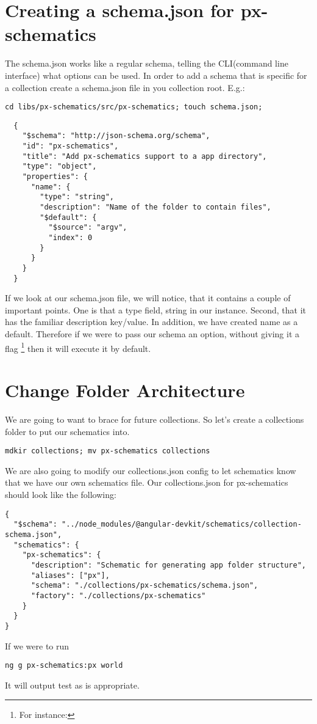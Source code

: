 \section{ Creating a schema.json for px-schematics }
The schema.json works like a regular schema, telling the CLI(command line
interface) what options can be used. In order to add a schema that is specific
for a collection create a schema.json file in you collection root. E.g.:
\begin{verbatim}
cd libs/px-schematics/src/px-schematics; touch schema.json;
\end{verbatim}

\begin{lstlisting}
  {
    "$schema": "http://json-schema.org/schema",
    "id": "px-schematics",
    "title": "Add px-schematics support to a app directory",
    "type": "object",
    "properties": {
      "name": {
        "type": "string",
        "description": "Name of the folder to contain files",
        "$default": {
          "$source": "argv",
          "index": 0
        }
      }
    }
  }
\end{lstlisting}
If we look at our schema.json file, we will notice, that it contains a couple
of important points. One is that a type field, string in our instance. Second,
that it has the familiar description key/value. In addition, we have created
name as a default. Therefore if we were to pass our schema an option, without
giving it a flag \footnote{For instance: }
then it will execute it by default.

\section{ Change Folder Architecture }
We are going to want to brace for future collections. So let's create a
collections folder to put our schematics into.
\begin{verbatim}
mdkir collections; mv px-schematics collections
\end{verbatim}

We are also going to modify our collections.json config to let schematics know
that we have our own schematics file. Our collections.json for px-schematics
should look like the following:

\begin{lstlisting}
{
  "$schema": "../node_modules/@angular-devkit/schematics/collection-schema.json",
  "schematics": {
    "px-schematics": {
      "description": "Schematic for generating app folder structure",
      "aliases": ["px"],
      "schema": "./collections/px-schematics/schema.json",
      "factory": "./collections/px-schematics"
    }
  }
}
\end{lstlisting}

If we were to run
\begin{verbatim}
ng g px-schematics:px world
\end{verbatim}

It will output test as is appropriate.
